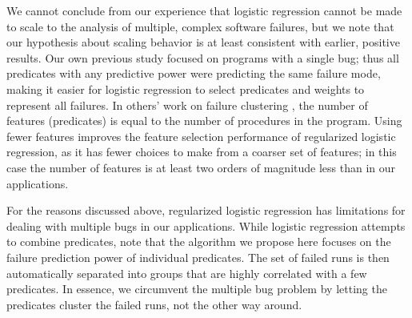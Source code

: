 We cannot conclude from our experience that logistic regression cannot
be made to scale to the analysis of multiple, complex software failures, but we
note that our hypothesis about scaling behavior is at least
consistent with earlier, positive results.  Our own previous study
focused on programs with a single bug; thus all predicates with any
predictive power were predicting the same failure mode, making it
easier for logistic regression to select predicates and weights to
represent all failures.  In others' work on failure clustering
\cite{ICSE`03*465}, the number of features (predicates) is equal to
the number of procedures in the program.  Using fewer features 
improves the feature selection performance of regularized logistic regression, as it has fewer choices to
make from a coarser set of features; in this case the number of features is at least two orders of
magnitude less than in our applications.

For the reasons discussed above, regularized logistic regression has
limitations for dealing with multiple bugs in our applications.  While logistic
regression attempts to combine predicates, note that the algorithm we
propose here focuses on the failure prediction power of individual 
predicates.
The set of failed runs is then automatically separated into groups that
are highly correlated with a few predicates.
In essence, we circumvent the multiple bug problem by letting the
predicates cluster the failed runs, not the other way around. 

